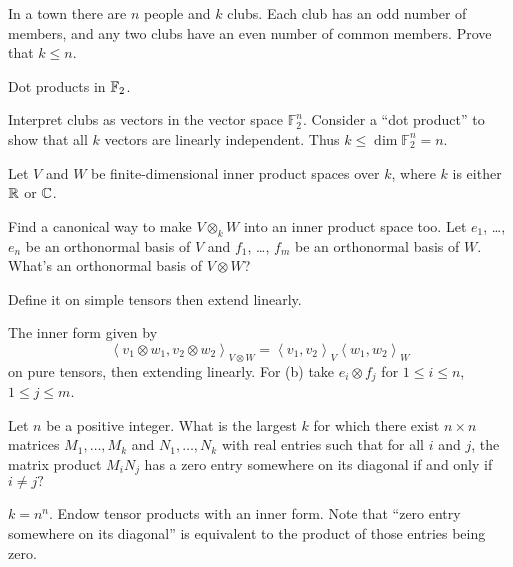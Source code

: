 \begin{problem}
	\gim
	In a town there are $n$ people and $k$ clubs.
	Each club has an odd number of members,
	and any two clubs have an even number of common members.
	Prove that $k \le n$.
	\begin{hint}
		Dot products in $\mathbb F_2$.
	\end{hint}
	\begin{sol}
		Interpret clubs as vectors in the vector space $\mathbb F_2^n$.
		Consider a ``dot product'' to show that all $k$ vectors are linearly independent.
		Thus $k \le \dim \mathbb F_2^n = n$.
	\end{sol}
\end{problem}

\begin{sproblem}
	\label{prob:inner_prod_tensor}
	Let $V$ and $W$ be finite-dimensional inner product spaces over $k$,
	where $k$ is either $\mathbb R$ or $\mathbb C$.
	\begin{enumerate}[(a)]
		\ii Find a canonical way to make $V \otimes_k W$ into an inner product space too.
		\ii Let $e_1$, \dots, $e_n$ be an orthonormal basis of $V$
		and $f_1$, \dots, $f_m$ be an orthonormal basis of $W$.
		What's an orthonormal basis of $V \otimes W$?
	\end{enumerate}
	\begin{hint}
		Define it on simple tensors then extend linearly.
	\end{hint}
	\begin{sol}
		The inner form given by
		\[ \left< v_1 \otimes w_1 , v_2 \otimes w_2 \right>_{V \otimes W}
		= \left< v_1,v_2 \right>_V \left< w_1,w_2\right>_W \]
		on pure tensors, then extending linearly.
		For (b) take $e_i \otimes f_j$ for $1 \le i \le n$, $1 \le j \le m$.
	\end{sol}
\end{sproblem}

\begin{problem}[Putnam 2014]
	\gim
	Let $n$ be a positive integer.
	What is the largest $k$ for which there exist
	$n\times n$ matrices $M_1,\dots,M_k$ and $N_1,\dots,N_k$
	with real entries such that for all $i$ and $j$,
	the matrix product $M_i N_j$ has a zero entry somewhere
	on its diagonal if and only if $i \ne j?$
	\begin{hint}
		$k = n^n$.
		Endow tensor products with an inner form.
		Note that ``zero entry somewhere on its diagonal''
		is equivalent to the product of those entries being zero.
	\end{hint}
\end{problem}

